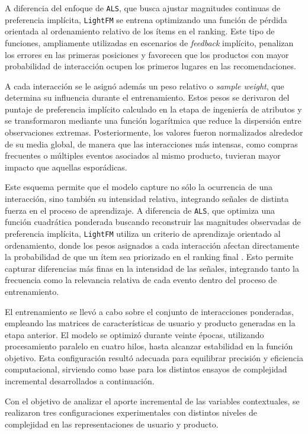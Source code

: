A diferencia del enfoque de \texttt{ALS}, que busca ajustar magnitudes continuas de preferencia implícita, \texttt{LightFM} se entrena optimizando una función de pérdida orientada al ordenamiento relativo de los ítems en el ranking. Este tipo de funciones, ampliamente utilizadas en escenarios de \textit{feedback} implícito, penalizan los errores en las primeras posiciones y favorecen que los productos con mayor probabilidad de interacción ocupen los primeros lugares en las recomendaciones.

A cada interacción se le asignó además un peso relativo o \textit{sample weight}, que determina su influencia durante el entrenamiento. Estos pesos se derivaron del puntaje de preferencia implícito calculado en la etapa de ingeniería de atributos y se transformaron mediante una función logarítmica que reduce la dispersión entre observaciones extremas. Posteriormente, los valores fueron normalizados alrededor de su media global, de manera que las interacciones más intensas, como compras frecuentes o múltiples eventos asociados al mismo producto, tuvieran mayor impacto que aquellas esporádicas.  

Este esquema permite que el modelo capture no sólo la ocurrencia de una interacción, sino también su intensidad relativa, integrando señales de distinta fuerza en el proceso de aprendizaje. A diferencia de \texttt{ALS}, que optimiza una función cuadrática ponderada buscando reconstruir las magnitudes observadas de preferencia implícita, \texttt{LightFM} utiliza un criterio de aprendizaje orientado al ordenamiento, donde los pesos asignados a cada interacción afectan directamente la probabilidad de que un ítem sea priorizado en el ranking final \cite{ARTICLE:Rendle2009, ARTICLE:LightFM2015}. Esto permite capturar diferencias más finas en la intensidad de las señales, integrando tanto la frecuencia como la relevancia relativa de cada evento dentro del proceso de entrenamiento.

El entrenamiento se llevó a cabo sobre el conjunto de interacciones ponderadas, empleando las matrices de características de usuario y producto generadas en la etapa anterior. El modelo se optimizó durante veinte épocas, utilizando procesamiento paralelo en cuatro hilos, hasta alcanzar estabilidad en la función objetivo. Esta configuración resultó adecuada para equilibrar precisión y eficiencia computacional, sirviendo como base para los distintos ensayos de complejidad incremental desarrollados a continuación.

Con el objetivo de analizar el aporte incremental de las variables contextuales, se realizaron tres configuraciones experimentales con distintos niveles de complejidad en las representaciones de usuario y producto.  

